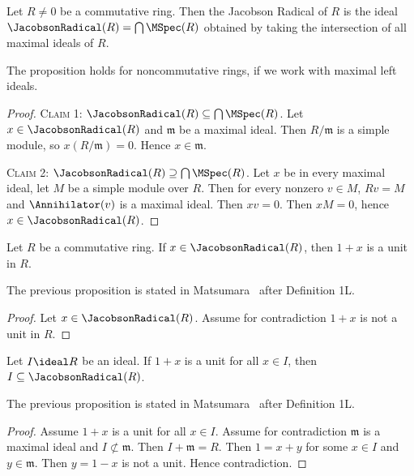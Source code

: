\begin{proposition}
Let $R\neq0$ be a commutative ring. Then the Jacobson Radical of $R$
is the ideal $\JacobsonRadical(R)=\bigcap\MSpec(R)$ obtained by taking
the intersection of all maximal ideals of $R$.
\end{proposition}

The proposition holds for noncommutative rings, if we work with
maximal left ideals.

\begin{proof}
\textsc{Claim 1:} $\JacobsonRadical(R)\subset\bigcap\MSpec(R)$.
Let $x\in\JacobsonRadical(R)$ and $\mathfrak{m}$ be a maximal ideal.
Then $R/\mathfrak{m}$ is a simple module, so $x(R/\mathfrak{m})=0$.
Hence $x\in\mathfrak{m}$.

\textsc{Claim 2:} $\JacobsonRadical(R)\supset\bigcap\MSpec(R)$.
Let $x$ be in every maximal ideal, let $M$ be a simple module over $R$.
Then for every nonzero $v\in M$, $Rv=M$ and $\Annihilator(v)$ is a
maximal ideal. Then $xv=0$. Then $xM=0$, hence $x\in\JacobsonRadical(R)$.
\end{proof}

\begin{proposition}
Let $R$ be a commutative ring. If $x\in\JacobsonRadical(R)$,
then $1+x$ is a unit in $R$.
\end{proposition}

The previous proposition is stated in Matsumara~\cite{matsumura1970commutative}
after Definition 1L.

\begin{proof}
Let $x\in\JacobsonRadical(R)$. Assume for contradiction $1+x$ is not a
unit in $R$.
\end{proof}

\begin{proposition}
Let $I\ideal R$ be an ideal. If $1+x$ is a unit for all $x\in I$,
then $I\subset\JacobsonRadical(R)$.
\end{proposition}

The previous proposition is stated in Matsumara~\cite{matsumura1970commutative}
after Definition 1L.

\begin{proof}
Assume $1+x$ is a unit for all $x\in I$.
Assume for contradiction $\mathfrak{m}$ is a maximal ideal and
$I\nsubset\mathfrak{m}$.
Then $I+\mathfrak{m}=R$.
Then $1=x+y$ for some $x\in I$ and $y\in\mathfrak{m}$.
Then $y=1-x$ is not a unit. Hence contradiction.
\end{proof}

